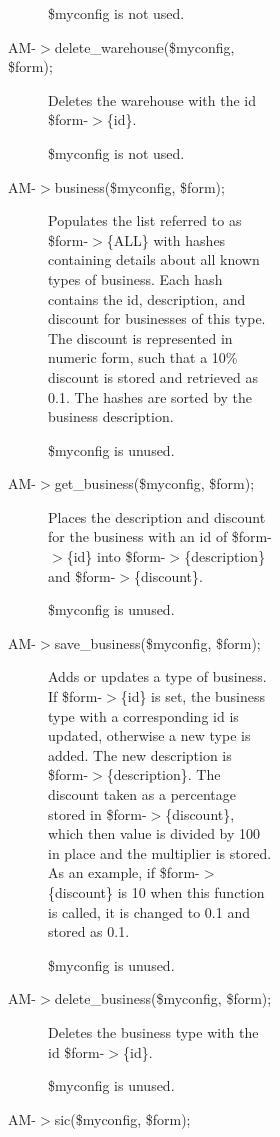 \begin{description}
\begin{description}
\begin{description}
\begin{description}
\begin{description}
\begin{description}
\begin{description}
\$myconfig is not used.


\item[{AM-$>$delete\_warehouse(\$myconfig, \$form);}] \mbox{}

Deletes the warehouse with the id \$form-$>$\{id\}.



\$myconfig is not used.


\item[{AM-$>$business(\$myconfig, \$form);}] \mbox{}

Populates the list referred to as \$form-$>$\{ALL\} with hashes containing details
about all known types of business.  Each hash contains the id, description, and
discount for businesses of this type.  The discount is represented in numeric
form, such that a 10\% discount is stored and retrieved as 0.1.  The hashes are
sorted by the business description.



\$myconfig is unused.


\item[{AM-$>$get\_business(\$myconfig, \$form);}] \mbox{}

Places the description and discount for the business with an id of \$form-$>$\{id\}
into \$form-$>$\{description\} and \$form-$>$\{discount\}.



\$myconfig is unused.


\item[{AM-$>$save\_business(\$myconfig, \$form);}] \mbox{}

Adds or updates a type of business.  If \$form-$>$\{id\} is set, the business type
with a corresponding id is updated, otherwise a new type is added.  The new
description is \$form-$>$\{description\}.  The discount taken as a percentage stored
in \$form-$>$\{discount\}, which then value is divided by 100 in place and the
multiplier is stored.  As an example, if \$form-$>$\{discount\} is 10 when this
function is called, it is changed to 0.1 and stored as 0.1.



\$myconfig is unused.


\item[{AM-$>$delete\_business(\$myconfig, \$form);}] \mbox{}

Deletes the business type with the id \$form-$>$\{id\}.



\$myconfig is unused.


\item[{AM-$>$sic(\$myconfig, \$form);}] \mbox{}


\end{description}
\end{description}
\end{description}
\end{description}
\end{description}
\end{description}
\end{description}
